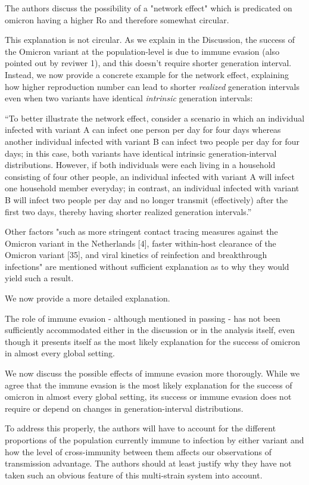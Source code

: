 \documentclass[12pt]{article}
\newcommand{\revtext}{\textsf}
\begin{document}
\revtext{The authors discuss the possibility of a "network effect" which is predicated on omicron having a higher Ro and therefore somewhat circular.}

This explanation is not circular. As we explain in the Discussion, the success of the Omicron variant at the population-level is due to immune evasion (also pointed out by reviwer 1), and this doesn't require shorter generation interval. Instead, we now provide a concrete example for the network effect, explaining how higher reproduction number can lead to shorter \emph{realized} generation intervals even when two variants have identical \emph{intrinsic} generation intervals:

``To better illustrate the network effect, consider a scenario in which an individual infected with variant A can infect one person per day for four days whereas another individual infected with variant B can infect two people per day for four days;
in this case, both variants have identical intrinsic generation-interval distributions.
However, if both individuals were each living in a household consisting of four other people, an individual infected with variant A will infect one household member everyday; in contrast, an individual infected with variant B will infect two people per day and no longer transmit (effectively) after the first two days, thereby having shorter realized generation intervals.''

\revtext{Other factors "such as more stringent contact tracing measures against the Omicron variant in the Netherlands [4], faster within-host clearance of the Omicron variant [35], and viral kinetics of reinfection and breakthrough infections" are mentioned without sufficient explanation as to why they would yield such a result.}

We now provide a more detailed explanation.

\revtext{The role of immune evasion - although mentioned in passing - has not been sufficiently accommodated either in the discussion or in the analysis itself, even though it presents itself as the most likely explanation for the success of omicron in almost every global setting.}

We now discuss the possible effects of immune evasion more thorougly. While we agree that the immune evasion is the most likely explanation for the success of omicron in almost every global setting, its success or immune evasion does not require or depend on changes in generation-interval distributions.

\revtext{To address this properly, the authors will have to account for the different proportions of the population currently immune to infection by either variant and how the level of cross-immunity between them affects our observations of transmission advantage. The authors should at least justify why they have not taken such an obvious feature of this multi-strain system into account.}
\end{document}
